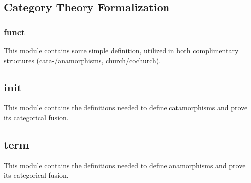 
\subsection{Category Theory Formalization}
\subsubsection{funct}
This module contains some simple definition, utilized in both complimentary structures (cata-/anamorphisms, church/cochurch).



\subsection{init}
This module contains the definitions needed to define catamorphisms and prove its categorical fusion.




\subsection{term}
This module contains the definitions needed to define anamorphisms and prove its categorical fusion.


